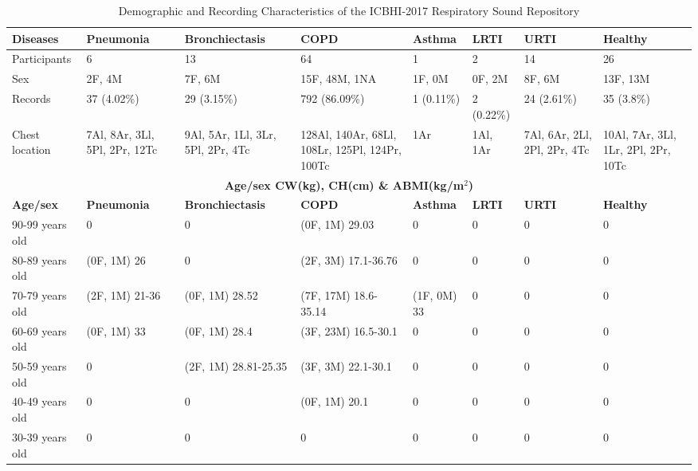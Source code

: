 \begin{table}[h]
    \centering
    \caption{Demographic and Recording Characteristics of the ICBHI-2017 Respiratory Sound Repository}
    \renewcommand{\arraystretch}{1.3} %
    \begin{tabular}{|p{1.8cm}|p{1.8cm}|p{2cm}|p{1.8cm}|p{1.8cm}|p{1.8cm}|p{1.8cm}|p{1.8cm}|}  
        \hline
        \textbf{Diseases} & \textbf{Pneumonia} & \textbf{Bronchiectasis} & \textbf{COPD} & \textbf{Asthma} & \textbf{LRTI} & \textbf{URTI} & \textbf{Healthy} \\
        \hline
        Participants & 6 & 13 & 64 & 1 & 2 & 14 & 26 \\
        \hline
        Sex & 2F, 4M & 7F, 6M & 15F, 48M, 1NA & 1F, 0M & 0F, 2M & 8F, 6M & 13F, 13M \\
        \hline
        Records & 37 (4.02\%) & 29 (3.15\%) & 792 (86.09\%) & 1 (0.11\%) & 2 (0.22\%) & 24 (2.61\%) & 35 (3.8\%) \\
        \hline
        Chest location & 7Al, 8Ar, 3Ll, 5Pl, 2Pr, 12Tc & 9Al, 5Ar, 1Ll, 3Lr, 5Pl, 2Pr, 4Tc & 128Al, 140Ar, 68Ll, 108Lr, 125Pl, 124Pr, 100Tc & 1Ar & 1Al, 1Ar & 7Al, 6Ar, 2Ll, 2Pl, 2Pr, 4Tc & 10Al, 7Ar, 3Ll, 1Lr, 2Pl, 2Pr, 10Tc \\
        \hline
        \multicolumn{8}{|c|}{\textbf{Age/sex CW(kg), CH(cm) \& ABMI(kg/m$^2$)}} \\
        \hline
        \textbf{Age/sex} & \textbf{Pneumonia} & \textbf{Bronchiectasis} & \textbf{COPD} & \textbf{Asthma} & \textbf{LRTI} & \textbf{URTI} & \textbf{Healthy} \\
        \hline
        90-99 years old & 0 & 0 & (0F, 1M) 29.03 & 0 & 0 & 0 & 0 \\
        \hline
        80-89 years old & (0F, 1M) 26 & 0 & (2F, 3M) 17.1-36.76 & 0 & 0 & 0 & 0 \\
        \hline
        70-79 years old & (2F, 1M) 21-36 & (0F, 1M) 28.52 & (7F, 17M) 18.6-35.14 & (1F, 0M) 33 & 0 & 0 & 0 \\
        \hline
        60-69 years old & (0F, 1M) 33 & (0F, 1M) 28.4 & (3F, 23M) 16.5-30.1 & 0 & 0 & 0 & 0 \\
        \hline
        50-59 years old & 0 & (2F, 1M) 28.81-25.35 & (3F, 3M) 22.1-30.1 & 0 & 0 & 0 & 0 \\
        \hline
        40-49 years old & 0 & 0 & (0F, 1M) 20.1 & 0 & 0 & 0 & 0 \\
        \hline
        30-39 years old & 0 & 0 & 0 & 0 & 0 & 0 & 0 \\

\end{tabular}
\end{table}
